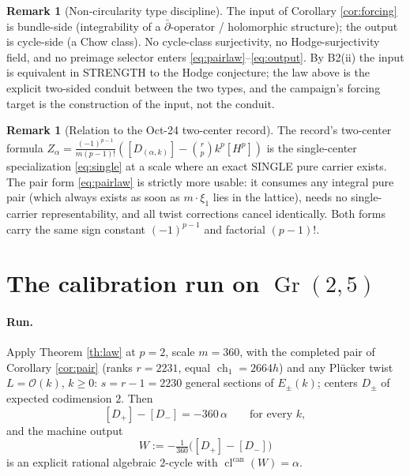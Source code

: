 \documentclass[11pt]{article}
\theoremstyle{definition}
\newtheorem{remark}[theorem]{Remark}
\newcommand{\ch}{\operatorname{ch}}
\newcommand{\Gr}{\operatorname{Gr}}
\newcommand{\cl}{\operatorname{cl}^{\operatorname{can}}}
\newcommand{\ddbar}{\bar\partial}
\newcommand{\Oo}{\mathcal O}
\begin{document}
\begin{remark}[Non-circularity type discipline]
The input of Corollary \ref{cor:forcing} is bundle-side
(integrability of a $\ddbar$-operator / holomorphic structure); the
output is cycle-side (a Chow class). No cycle-class surjectivity,
no Hodge-surjectivity field, and no preimage selector enters
\eqref{eq:pairlaw}--\eqref{eq:output}. By B2(ii) the input is
equivalent in STRENGTH to the Hodge conjecture; the law above is the
explicit two-sided conduit between the two types, and the campaign's
forcing target is the construction of the input, not the conduit.
\end{remark}

\begin{remark}[Relation to the Oct-24 two-center record]
The record's two-center formula
$Z_\alpha=\tfrac{(-1)^{p-1}}{m(p-1)!}([D_{(\alpha,k)}]
-\binom{r}{p}k^{p}[H^{p}])$ is the single-center specialization
\eqref{eq:single} at a scale where an exact SINGLE pure carrier
exists. The pair form \eqref{eq:pairlaw} is strictly more usable: it
consumes any integral pure pair (which always exists as soon as
$m\cdot\xi_1$ lies in the lattice), needs no single-carrier
representability, and all twist corrections cancel identically. Both
forms carry the same sign constant $(-1)^{p-1}$ and factorial
$(p-1)!$.
\end{remark}

\section{The calibration run on $\Gr(2,5)$}

\paragraph{Run.}
Apply Theorem \ref{th:law} at $p=2$, scale $m=360$, with the completed
pair of Corollary \ref{cor:pair} (ranks $r=2231$, equal
$\ch_1=2664h$) and any Pl\"ucker twist $L=\Oo(k)$, $k\ge0$:
$s=r-1=2230$ general sections of $E_\pm(k)$; centers $D_\pm$ of
expected codimension $2$. Then
\[
[D_+]-[D_-]=-360\,\alpha
\qquad\text{for every }k,
\]
and the machine output
\[
W:=-\tfrac1{360}\bigl([D_+]-[D_-]\bigr)
\]
is an explicit rational algebraic $2$-cycle with $\cl(W)=\alpha$.
\end{document}

